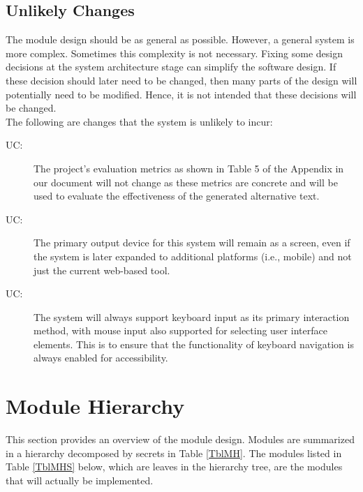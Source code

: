 \documentclass[12pt, titlepage]{article}
\newcounter{ucnum}
\newcommand{\uctheucnum}{UC\theucnum}
\begin{document}
\subsection{Unlikely Changes} \label{SecUchange}

The module design should be as general as possible. However, a general system is
more complex. Sometimes this complexity is not necessary. Fixing some design
decisions at the system architecture stage can simplify the software design. If
these decision should later need to be changed, then many parts of the design
will potentially need to be modified. Hence, it is not intended that these
decisions will be changed.\\

\noindent The following are changes that the system is unlikely to incur:
\begin{description}
  \item[ \uctheucnum \label{ucIO}:] The
    project's evaluation metrics as shown in Table 5 of the
    Appendix in our \citet{SRS} document will not change as these
    metrics are concrete and
    will be used to evaluate the effectiveness of the generated
    alternative text.
  \item [ \uctheucnum \label{ucIO}:] The
    primary output device for this system will remain as a screen,
    even if the system is later expanded to additional platforms
    (i.e., mobile) and not just the current web-based tool.
  \item [ \uctheucnum \label{ucIO}:] The system
    will always support keyboard input as its primary
    interaction method, with mouse input also supported for selecting
    user interface elements. This is to ensure that
    the functionality of keyboard navigation is always enabled for
    accessibility.

\end{description}

\section{Module Hierarchy} \label{SecMH}

This section provides an overview of the module design. Modules are summarized
in a hierarchy decomposed by secrets in Table \ref{TblMH}. The
modules listed in Table \ref{TblMHS}
below, which are leaves in the hierarchy tree, are the modules that will
actually be implemented.
\end{document}
